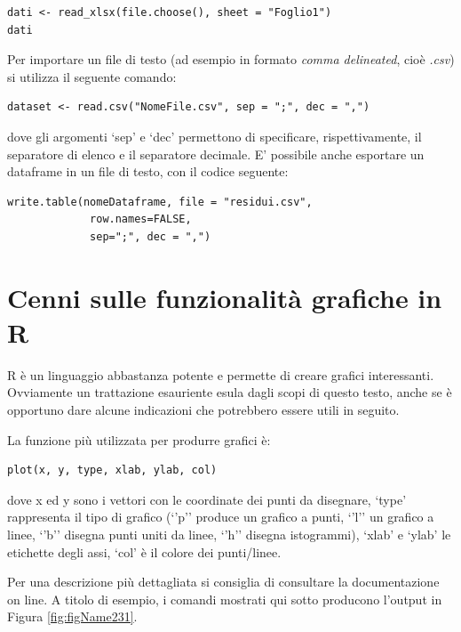 \documentclass[a4paper,12pt,oneside]{book}
\begin{document}
\begin{verbatim}
dati <- read_xlsx(file.choose(), sheet = "Foglio1")
dati
\end{verbatim}

Per importare un file di testo (ad esempio in formato \emph{comma delineated}, cioè \emph{.csv}) si utilizza il seguente comando:

\begin{verbatim}
dataset <- read.csv("NomeFile.csv", sep = ";", dec = ",")
\end{verbatim}

dove gli argomenti `sep' e `dec' permettono di specificare, rispettivamente, il separatore di elenco e il separatore decimale. E' possibile anche esportare un dataframe in un file di testo, con il codice seguente:

\begin{verbatim}
write.table(nomeDataframe, file = "residui.csv", 
             row.names=FALSE, 
             sep=";", dec = ",")
\end{verbatim}

\hypertarget{cenni-sulle-funzionalituxe0-grafiche-in-r}{%
\section{Cenni sulle funzionalità grafiche in R}\label{cenni-sulle-funzionalituxe0-grafiche-in-r}}

R è un linguaggio abbastanza potente e permette di creare grafici interessanti. Ovviamente un trattazione esauriente esula dagli scopi di questo testo, anche se è opportuno dare alcune indicazioni che potrebbero essere utili in seguito.

La funzione più utilizzata per produrre grafici è:

\begin{verbatim}
plot(x, y, type, xlab, ylab, col)
\end{verbatim}

dove x ed y sono i vettori con le coordinate dei punti da disegnare, `type' rappresenta il tipo di grafico (`'p'' produce un grafico a punti, `'l'' un grafico a linee, `'b'' disegna punti uniti da linee, `'h'' disegna istogrammi), `xlab' e `ylab' le etichette degli assi, `col' è il colore dei punti/linee.

Per una descrizione più dettagliata si consiglia di consultare la documentazione on line. A titolo di esempio, i comandi mostrati qui sotto producono l'output in Figura \ref{fig:figName231}.
\end{document}
